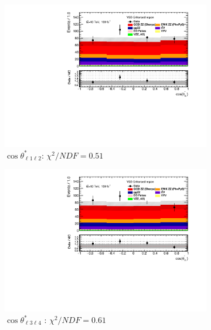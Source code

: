 \begin{figure}[!htb]
    \centering
    \begin{subfigure}{.49\textwidth}
        \centering
        \includegraphics[width=.98\linewidth]{figures/Results/RecoDist_VBSEnhanced/reco_cosThetaStar1_SR.pdf}
        \caption{ \footnotesize{$\cos \theta^{*}_{\ell 1 \ell 2}$}: $\chi^2/NDF = 0.51$ }
    \end{subfigure}
    \begin{subfigure}{.49\textwidth}
        \centering
        \includegraphics[width=.98\linewidth]{figures/Results/RecoDist_VBSEnhanced/reco_cosThetaStar3_SR.pdf}
        \caption{ \footnotesize{$\cos \theta^{*}_{\ell 3 \ell 4}$ }: $\chi^2/NDF = 0.61$ }
    \end{subfigure}\\
    \begin{subfigure}{.49\textwidth}

\end{subfigure}
\end{figure}
